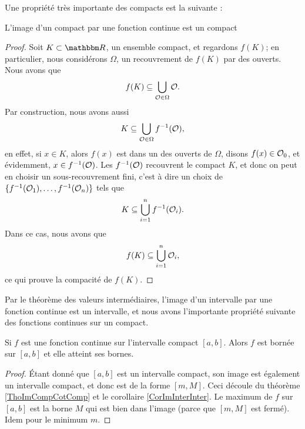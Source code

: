 Une propriété très importante des compacts est la suivante :
\begin{theorem}		\label{ThoImCompCotComp}
L'image d'un compact par une fonction continue est un compact
\end{theorem}

\begin{proof}
	Soit $K\subset \eR$, un ensemble compact, et regardons $f(K)$; en particulier, nous considérons $\Omega$, un recouvrement de $f(K)$ par des ouverts. Nous avons que
	\begin{equation}
		f(K)\subseteq\bigcup_{\mathcal{O}\in\Omega}\mathcal{O}.
	\end{equation}
	Par construction, nous avons aussi
	\begin{equation}
		K\subseteq\bigcup_{\mathcal{O}\in\Omega}f^{-1}(\mathcal{O}),
	\end{equation}
	en effet, si $x\in K$, alors $f(x)$ est dans un des ouverts de $\Omega$, disons $f(x)\in \mathcal{O}_0$, et évidemment, $x\in f^{-1}(\mathcal{O})$.  Les $f^{-1}(\mathcal{O})$ recouvrent le compact $K$, et donc on peut en choisir un sous-recouvrement fini, c'est à dire un choix de $\{ f^{-1}(\mathcal{O}_1),\ldots,f^{-1}(\mathcal{O}_n) \}$ tels que
	\begin{equation}
		K\subseteq \bigcup_{i=1}^nf^{-1}(\mathcal{O}_i).
	\end{equation}
	Dans ce cas, nous avons que
	\begin{equation}
		f(K)\subseteq\bigcup_{i=1}^n\mathcal{O}_i,
	\end{equation}
	ce qui prouve la compacité de $f(K)$.
\end{proof}

Par le théorème des valeurs intermédiaires, l'image d'un intervalle par une fonction continue est un intervalle, et nous avons l'importante propriété suivante des fonctions continues sur un compact.

\begin{theorem}
	Si $f$ est une fonction continue sur l'intervalle compact $[a,b]$. Alors $f$ est bornée sur $[a,b]$ et elle atteint ses bornes.
\end{theorem}

\begin{proof}
	Étant donné que $[a,b]$ est un intervalle compact, son image est également un intervalle compact, et donc est de la forme $[m,M]$. Ceci découle du théorème \ref{ThoImCompCotComp} et le corollaire \ref{CorImInterInter}. Le maximum de $f$ sur $[a,b]$ est la borne $M$ qui est bien dans l'image (parce que $[m,M]$ est fermé). Idem pour le minimum $m$.
\end{proof}

